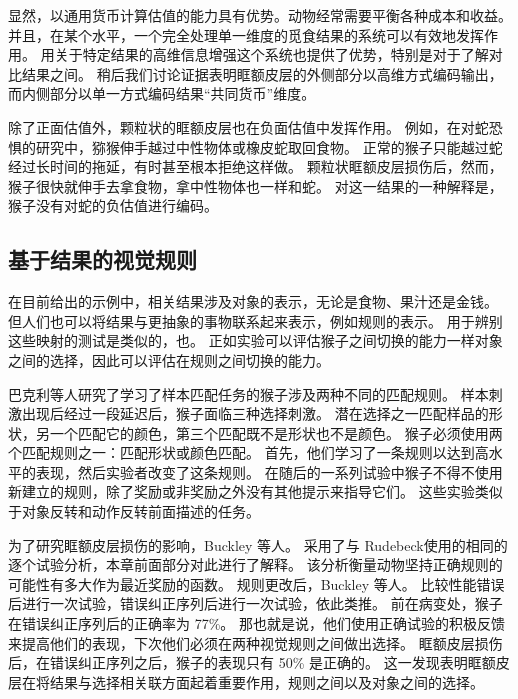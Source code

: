 显然，以通用货币计算估值的能力具有优势。动物经常需要平衡各种成本和收益。
并且，在某个水平，一个完全处理单一维度的觅食结果的系统可以有效地发挥作用。
用关于特定结果的高维信息增强这个系统也提供了优势，特别是对于了解对比结果之间。
稍后我们讨论证据表明眶额皮层的外侧部分以高维方式编码输出，而内侧部分以单一方式编码结果“共同货币”维度。\par


除了正面估值外，颗粒状的眶额皮层也在负面估值中发挥作用。
例如，在对蛇恐惧的研究中，猕猴伸手越过中性物体或橡皮蛇取回食物。
正常的猴子只能越过蛇经过长时间的拖延，有时甚至根本拒绝这样做。
颗粒状眶额皮层损伤后，然而，猴子很快就伸手去拿食物，拿中性物体也一样和蛇\cite{izquierdo2005comparison}。
对这一结果的一种解释是，猴子没有对蛇的负估值进行编码。
\par



\subsection{基于结果的视觉规则}

在目前给出的示例中，相关结果涉及对象的表示，无论是食物、果汁还是金钱。
但人们也可以将结果与更抽象的事物联系起来表示，例如规则的表示。
用于辨别这些映射的测试是类似的，也。
正如实验可以评估猴子之间切换的能力一样对象之间的选择，因此可以评估在规则之间切换的能力。\par


巴克利等人\cite{buckley2009dissociable}研究了学习了样本匹配任务的猴子涉及两种不同的匹配规则。
样本刺激出现后经过一段延迟后，猴子面临三种选择刺激。
潜在选择之一匹配样品的形状，另一个匹配它的颜色，第三个匹配既不是形状也不是颜色。
猴子必须使用两个匹配规则之一：匹配形状或颜色匹配。
首先，他们学习了一条规则以达到高水平的表现，然后实验者改变了这条规则。
在随后的一系列试验中猴子不得不使用新建立的规则，除了奖励或非奖励之外没有其他提示来指导它们。
这些实验类似于对象反转和动作反转前面描述的任务。\par


为了研究眶额皮层损伤的影响，Buckley 等人。
采用了与 Rudebeck\cite{rudebeck2008frontal}使用的相同的逐个试验分析，本章前面部分对此进行了解释。
该分析衡量动物坚持正确规则的可能性有多大作为最近奖励的函数。
规则更改后，Buckley 等人。
比较性能错误后进行一次试验，错误纠正序列后进行一次试验，依此类推。
前在病变处，猴子在错误纠正序列后的正确率为 77\%。
那也就是说，他们使用正确试验的积极反馈来提高他们的表现，下次他们必须在两种视觉规则之间做出选择。
眶额皮层损伤后，在错误纠正序列之后，猴子的表现只有 50\% 是正确的。
这一发现表明眶额皮层在将结果与选择相关联方面起着重要作用，规则之间以及对象之间的选择。\par



